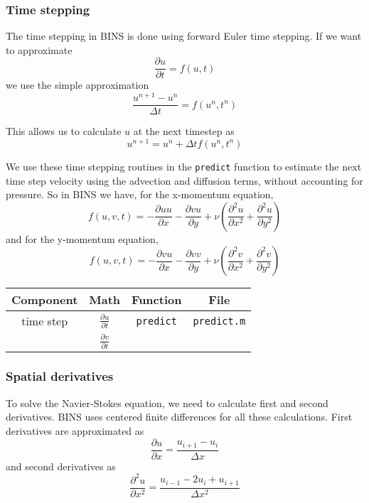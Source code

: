\documentclass[12pt]{article}
\begin{document}
\subsubsection{Time stepping}
The time stepping in BINS is done using forward Euler time stepping.  If we want to approximate 
\[ \frac{\partial u}{\partial t} = f(u,t) \]
we use the simple approximation
\[ \frac{u^{n+1}-u^n}{\Delta t} = f(u^n,t^n)\]

This allows us to calculate $u$ at the next timestep as
\begin{equation}
u^{n+1} = u^n + \Delta t f(u^n,t^n)
\end{equation}

We use these time stepping routines in the \texttt{predict} function to estimate the next time step velocity using the advection and diffusion terms, without accounting for pressure.  So in BINS we have, for the x-momentum equation,
\[ f(u,v,t) = -\frac{\partial u u}{\partial x}-\frac{\partial v u}{\partial y} + \nu\left( \frac{\partial^2 u}{\partial x^2} + \frac{\partial^2 u}{\partial y^2} \right) \]
and for the y-momentum equation,
\[ f(u,v,t) = -\frac{\partial v u}{\partial x}-\frac{\partial v v}{\partial y} + \nu\left( \frac{\partial^2 v}{\partial x^2} + \frac{\partial^2 v}{\partial y^2} \right) \]

\begin{center}
\begin{tabular}{|c|c|c|c|}
\hline 
\bf{Component} & \bf{Math} & \bf{Function} & \bf{File}\\ 
\hline 
time step & \Large{$\frac{\partial u}{\partial t}$} & \texttt{predict}& \texttt{predict.m} \\ 
 & \Large{$\frac{\partial v}{\partial t}$} &  &   \\ 
\hline 
\end{tabular} 
\end{center}

\subsubsection{Spatial derivatives}
To solve the Navier-Stokes equation, we need to calculate first and second derivatives.  BINS uses centered finite differences for all these calculations.  First derivatives are approximated as
\begin{equation}
\label{firstDeriv}
\frac{\partial u}{\partial x} = \frac{u_{i+1} - u_{i}}{\Delta x}
\end{equation}
and second derivatives as
\begin{equation}
\label{secondDeriv}
\frac{\partial^2 u}{\partial x^2} = \frac{u_{i-1} -2 u_i + u_{i+1}}{\Delta x^2}
\end{equation} 
\end{document}
